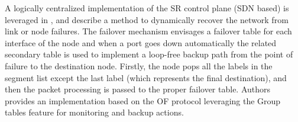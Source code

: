 A logically centralized implementation of the SR control plane (SDN based) is leveraged in
\cite{segmentfor}, \cite{srdynamicrestoration} and \cite{reliablesr} describe a method to dynamically recover the network from link or node failures. 
The failover mechanism envisages a failover table for each interface of the node and when a port goes down automatically the related secondary table is used to implement a loop-free backup path from the point of failure to the destination node. Firstly, the node pops all the labels in the segment list except the last label (which represents the final destination), and then the packet processing is passed to the proper failover table. Authors provides an implementation based on the OF protocol leveraging the Group tables feature for monitoring and backup actions. 

